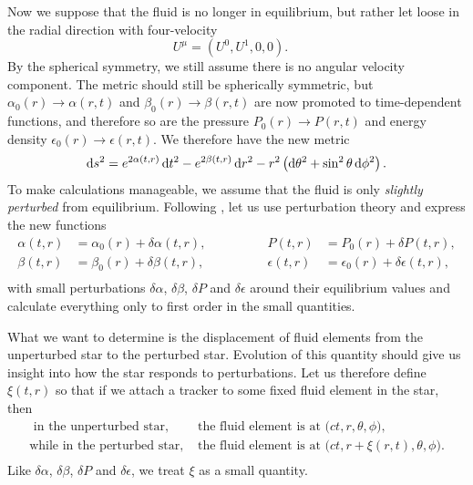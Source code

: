 Now we suppose that the fluid is no longer in equilibrium, but rather let loose in the radial direction with four-velocity
\begin{equation}
	U^\mu = (U^0, U^1, 0, 0) .
	\quad
\label{eq:nstars:velocity_unstable}
\end{equation}
By the spherical symmetry, we still assume there is no angular velocity component.
The metric should still be spherically symmetric, but $\alpha_0(r) \rightarrow \alpha(r,t)$ and $\beta_0(r) \rightarrow \beta(r,t)$ are now promoted to time-dependent functions, and therefore so are the pressure $P_0(r) \rightarrow P(r,t)$ and energy density $\epsilon_0(r) \rightarrow \epsilon(r,t)$.
We therefore have the new metric
\begin{equation}
	\mathop{}\!\mathrm{d} s^2 = e^{2 \alpha(t, r)} \mathop{}\!\mathrm{d} t^2 - e^{2 \beta(t, r)} \mathop{}\!\mathrm{d} r^2 - r^2 \left( \mathop{}\!\mathrm{d} \theta^2 + \sin^2 \theta \mathop{}\!\mathrm{d} \phi^2 \right) .
\label{eq:nstars:metric_unstable}
\end{equation}
To make calculations manageable, we assume that the fluid is only \emph{slightly perturbed} from equilibrium.
Following \cite{ref:chandrasekhar_stability}, let us use perturbation theory and express the new functions
\begin{equation}
\begin{aligned}
	\alpha   (t, r) &= \alpha_0  (r) + \delta \alpha  (t, r), & \qquad \qquad
	P        (t, r) &= P_0       (r) + \delta P       (t, r), \\
	\beta    (t, r) &= \beta_0   (r) + \delta \beta   (t, r), & \qquad \qquad
	\epsilon (t, r) &= \epsilon_0(r) + \delta \epsilon(t, r), \\
\end{aligned}
\label{eq:nstars:perturbation_expansion}
\end{equation}
with small perturbations $\delta \alpha$, $\delta \beta$, $\delta P$ and $\delta \epsilon$ around their equilibrium values and calculate everything only to first order in the small quantities.

What we want to determine is the displacement of fluid elements from the unperturbed star to the perturbed star.
Evolution of this quantity should give us insight into how the star responds to perturbations.
Let us therefore define $\xi(t, r)$ so that if we attach a tracker to some fixed fluid element in the star, then
\begin{equation}
\begin{split}
	\text{      in the unperturbed star, } & \text{the fluid element is at $\big(ct,r,\theta,\phi\big)$,} \\
	\text{while in the   perturbed star, } & \text{the fluid element is at $\big(ct,r+\xi(r,t),\theta,\phi\big)$.} \\
\end{split}
\end{equation}
Like $\delta \alpha$, $\delta \beta$, $\delta P$ and $\delta \epsilon$, we treat $\xi$ as a small quantity.


